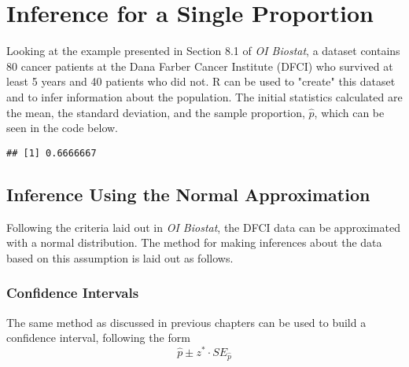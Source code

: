 
\section{Inference for a Single Proportion}
Looking at the example presented in Section 8.1 of \textit{OI Biostat}, a dataset contains 80 cancer patients at the Dana Farber Cancer Institute (DFCI) who survived at least 5 years and 40 patients who did not.  \textsf{R} can be used to "create" this dataset and to infer information about the population.  The initial statistics calculated are the mean, the standard deviation, and the sample proportion, $\hat{p}$, which can be seen in the code below.  

\begin{knitrout}
\color{fgcolor}\begin{kframe}
\begin{alltt}
 \hlkwb{=} \hlstd{(}\hlstd{(}\hlstd{,}\hlstd{),}\hlstd{(}\hlstd{,}\hlstd{))}
 \hlkwb{=} 
 \hlkwb{=} 
 \hlkwb{=} \hlopt{/}
\end{alltt}
\begin{verbatim}
## [1] 0.6666667
\end{verbatim}
\end{kframe}
\end{knitrout}

\subsection{Inference Using the Normal Approximation}
Following the criteria laid out in \textit{OI Biostat}, the DFCI data can be approximated with a normal distribution.  The method for making inferences about the data based on this assumption is laid out as follows.  

\subsubsection{Confidence Intervals}
The same method as discussed in previous chapters can be used to build a confidence interval, following the form 
\[ \hat{p} \pm z^* \cdot SE_{\hat{p}}\]

